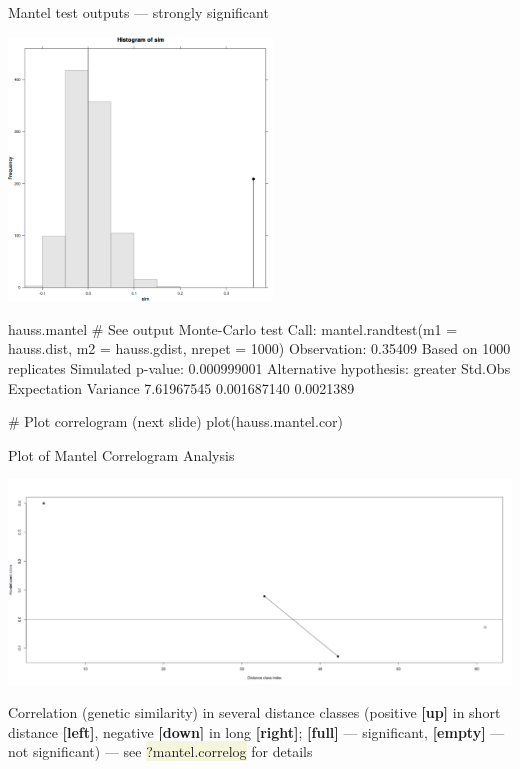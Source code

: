 \documentclass[compress, ucs, xelatex, 11pt, xcolor=svgnames, aspectratio=169,
	hyperref={
		bookmarks=true,
		unicode=true,
		colorlinks=true,
		pdftitle={Molecular data in R},
		plainpages=false,
		pdfauthor={Vojtech Zeisek},
		pdfsubject={Course about phylogeny and evolution in R},
		pdfcreator={XeLaTeX},
		pdfkeywords={R, evolution, phylogeny, molecular data},
		linkcolor=Crimson, %
		anchorcolor=Magenta, %
		citecolor=Magenta, %
		filecolor=Magenta, %
		menucolor=Magenta, %
		urlcolor=DodgerBlue, %
		pdftex},
	url={hyphens, lowtilde} %
	]{beamer}
\renewcommand{\texttt}[1]{\colorbox{Beige}{{\ttfamily #1}}}
\begin{document}
\begin{frame}[fragile]{Mantel test outputs --- strongly significant}
	\begin{multicols}{2}
		\includegraphics[height=7cm]{mantel.png}
		\vfill
		\begin{spluscode}
    hauss.mantel # See output
    Monte-Carlo test
    Call: mantel.randtest(m1 =
      hauss.dist, m2 =
      hauss.gdist, nrepet = 1000)
    Observation: 0.35409
    Based on 1000 replicates
    Simulated p-value: 0.000999001
    Alternative hypothesis: greater
      Std.Obs Expectation  Variance
    7.61967545 0.001687140 0.0021389
		\end{spluscode}
		\vfill
		\begin{spluscode}
    # Plot correlogram (next slide)
    plot(hauss.mantel.cor)
		\end{spluscode}
		\vfill
	\end{multicols}
\end{frame}

\begin{frame}{Plot of Mantel Correlogram Analysis}
	\vfil
	\begin{center}
		\includegraphics[width=\textwidth-5.5cm]{mantel-cor.png}
	\end{center}
	\vfil
	Correlation (genetic similarity) in several distance classes (positive \textbf{[up]} in short distance \textbf{[left]}, negative \textbf{[down]} in long \textbf{[right]}; \textbf{[full]} --- significant, \textbf{[empty]} --- not significant) --- see \texttt{?mantel.correlog} for details
	\vfill
\end{frame}
\end{document}
